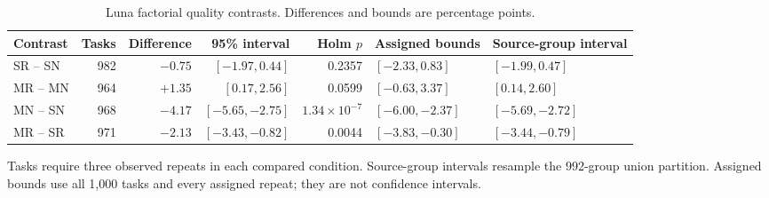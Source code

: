 \begin{table}[t]\centering
\caption{Luna factorial quality contrasts. Differences and bounds are percentage points.}
\label{tab:scale-contrasts}
\begin{tabular}{lrrrrll}\toprule
Contrast & Tasks & Difference & 95\% interval & Holm $p$ & Assigned bounds & Source-group interval\\\midrule
SR -- SN & 982 & $-0.75$ & $[-1.97, 0.44]$ & 0.2357 & $[-2.33, 0.83]$ & $[-1.99, 0.47]$\\
MR -- MN & 964 & $+1.35$ & $[0.17, 2.56]$ & 0.0599 & $[-0.63, 3.37]$ & $[0.14, 2.60]$\\
MN -- SN & 968 & $-4.17$ & $[-5.65, -2.75]$ & $1.34\times10^{-7}$ & $[-6.00, -2.37]$ & $[-5.69, -2.72]$\\
MR -- SR & 971 & $-2.13$ & $[-3.43, -0.82]$ & 0.0044 & $[-3.83, -0.30]$ & $[-3.44, -0.79]$\\
\bottomrule\end{tabular}
\par\smallskip\noindent Tasks require three observed repeats in each compared condition. Source-group intervals resample the 992-group union partition. Assigned bounds use all 1,000 tasks and every assigned repeat; they are not confidence intervals.
\end{table}
